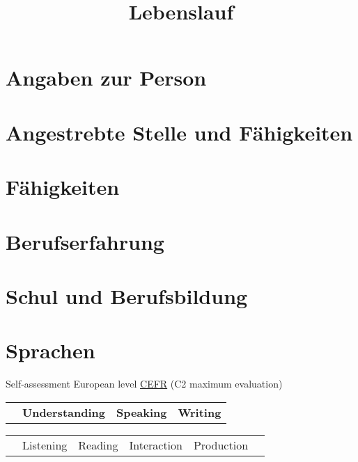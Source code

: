 \documentclass[11pt,a4paper,sans]{moderncv}
\title{Lebenslauf}               %
\begin{document}
\maketitle

\section{Angaben zur Person}
\myPersonalInformation{\myProfileId}


\section{Angestrebte Stelle und Fähigkeiten}
\cvline{}{\Large \myDesideredEmployment{\myProfileId}}
\cvline{}{\small \mySkillsForJobPosition{\myProfileId} 
}

\section{Fähigkeiten} 
\mySkills{\myProfileId}
 
\section{Berufserfahrung}
\myExperience{\myProfileId}

\section{Schul und Berufsbildung} 
\myEducation{\myProfileId}


\section{Sprachen}

\hspace{25mm}\small Self-assessment European level \href{http://europass.cedefop.europa.eu/en/resources/european-language-levels-cefr}{CEFR} (C2 maximum evaluation)\normalsize
\vspace{5mm}

\begin{tabular}{p{67mm} p{40mm} p{40mm} p{20mm}}
& \textbf{Understanding} & \textbf{Speaking} & \textbf{Writing} \\
\end{tabular}

\begin{tabular}{p{67mm} p{20mm} p{20mm} p{20mm} p{20mm} p{20mm}}
& Listening & Reading & Interaction & Production & \\
\end{tabular}
\end{document}

